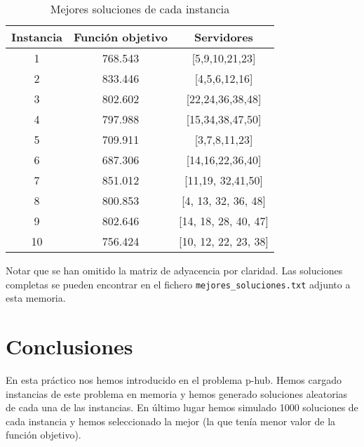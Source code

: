 \documentclass[11pt,a4paper,twoside,openright,titlepage,final]{article}
\begin{document}
\begin{table}[htbp!]
	\centering
	\caption{Mejores soluciones de cada instancia}
	\label{tbl:mejores}
	\begin{tabular}{@{}ccc@{}}
		\toprule
		Instancia & Función objetivo & Servidores               \\ \midrule
		1         & 768.543          & {[}5,9,10,21,23{]}       \\
		2         & 833.446          & {[}4,5,6,12,16{]}        \\
		3         & 802.602          & {[}22,24,36,38,48{]}     \\
		4         & 797.988          & {[}15,34,38,47,50{]}     \\
		5         & 709.911          & {[}3,7,8,11,23{]}        \\
		6         & 687.306          & {[}14,16,22,36,40{]}     \\
		7         & 851.012          & {[}11,19, 32,41,50{]}    \\
		8         & 800.853          & {[}4, 13, 32, 36, 48{]}  \\
		9         & 802.646          & {[}14, 18, 28, 40, 47{]} \\
		10        & 756.424          & {[}10, 12, 22, 23, 38{]} \\ \bottomrule
	\end{tabular}
\end{table}

Notar que se han omitido la matriz de adyacencia por claridad. Las soluciones completas se pueden encontrar en el fichero \texttt{mejores\_soluciones.txt} adjunto a esta memoria.


\section{Conclusiones}

En esta práctico nos hemos introducido en el problema p-hub. Hemos cargado instancias de este problema en memoria y hemos generado soluciones aleatorias de cada una de las instancias. En último lugar hemos simulado 1000 soluciones de cada instancia y hemos seleccionado la mejor (la que tenía menor valor de la función objetivo).
\end{document}
